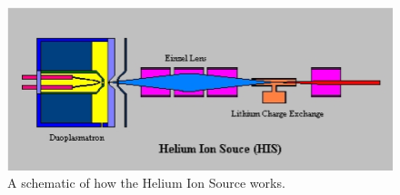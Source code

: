 \begin{figure}
    \centering
    \includegraphics[scale=0.75]{Setup_Figs/HIS.png}
    \caption{A schematic of how the Helium Ion Source works.}
    \label{fig:HIS}
\end{figure}